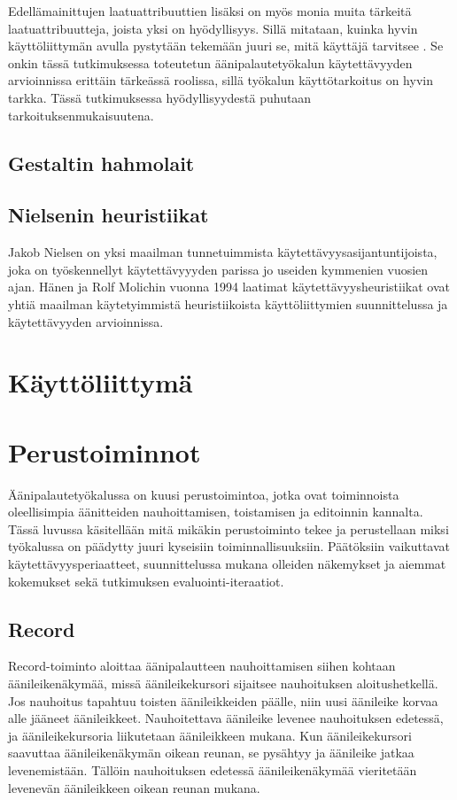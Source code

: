 \documentclass[utf8]{gradu3}
\begin{document}
Edellämainittujen laatuattribuuttien lisäksi on myös monia muita tärkeitä laatuattribuutteja, joista yksi on hyödyllisyys. Sillä mitataan, kuinka hyvin käyttöliittymän avulla pystytään tekemään juuri se, mitä käyttäjä tarvitsee \parencite[][]{intro-usability}. Se onkin tässä tutkimuksessa toteutetun äänipalautetyökalun käytettävyyden arvioinnissa erittäin tärkeässä roolissa, sillä työkalun käyttötarkoitus on hyvin tarkka. Tässä tutkimuksessa hyödyllisyydestä puhutaan tarkoituksenmukaisuutena.




\subsection{Gestaltin hahmolait}

\subsection{Nielsenin heuristiikat}

Jakob Nielsen on yksi maailman tunnetuimmista käytettävyysasijantuntijoista, joka on työskennellyt käytettävyyyden parissa jo useiden kymmenien vuosien ajan. Hänen ja Rolf Molichin vuonna 1994 laatimat käytettävyysheuristiikat ovat yhtiä maailman käytetyimmistä heuristiikoista käyttöliittymien suunnittelussa ja käytettävyyden arvioinnissa.

\section{Käyttöliittymä}

\section{Perustoiminnot}

Äänipalautetyökalussa on kuusi perustoimintoa, jotka ovat toiminnoista oleellisimpia äänitteiden nauhoittamisen, toistamisen ja editoinnin kannalta. Tässä luvussa käsitellään mitä mikäkin perustoiminto tekee ja perustellaan miksi työkalussa on päädytty juuri kyseisiin toiminnallisuuksiin. Päätöksiin vaikuttavat käytettävyysperiaatteet, suunnittelussa mukana olleiden näkemykset ja aiemmat kokemukset sekä tutkimuksen evaluointi-iteraatiot.


\subsection{Record}

Record-toiminto aloittaa äänipalautteen nauhoittamisen siihen kohtaan äänileikenäkymää, missä äänileikekursori sijaitsee nauhoituksen aloitushetkellä. Jos nauhoitus tapahtuu toisten äänileikkeiden päälle, niin uusi äänileike korvaa alle jääneet äänileikkeet. Nauhoitettava äänileike levenee nauhoituksen edetessä, ja äänileikekursoria liikutetaan äänileikkeen mukana. Kun äänileikekursori saavuttaa äänileikenäkymän oikean reunan, se pysähtyy ja äänileike jatkaa levenemistään. Tällöin nauhoituksen edetessä äänileikenäkymää vieritetään levenevän äänileikkeen oikean reunan mukana.
\end{document}

